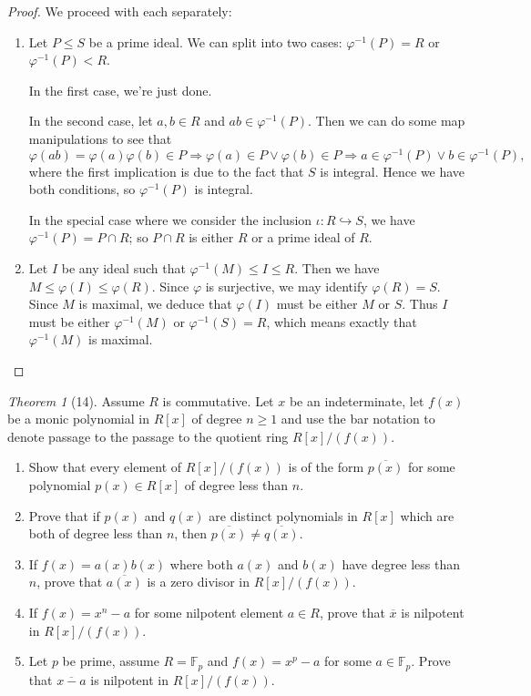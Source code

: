 \documentclass[12pt]{article}
\theoremstyle{remark}
\theoremstyle{named}
\newtheorem*{theorem}{Theorem}
\newcommand{\F}{\mathbb F}
\begin{document}
\begin{proof}
    We proceed with each separately:
    \begin{enumerate}
        \item Let \(P \le S\) be a prime ideal. We can split into two cases: \(\varphi^{-1}(P) = R\) or \(\varphi^{-1}(P) < R\).
        
        In the first case, we're just done. 

        In the second case, let \(a, b \in R\) and \(ab \in \varphi^{-1}(P)\). Then we can do some map manipulations to see that 
        \[\varphi(ab) = \varphi(a)\varphi(b) \in P \Rightarrow \varphi(a) \in P \lor \varphi(b) \in P \Rightarrow a \in \varphi^{-1}(P) \lor b \in \varphi^{-1}(P),\]
        where the first implication is due to the fact that \(S\) is integral. Hence we have both conditions, so \(\varphi^{-1}(P)\) is integral.

        In the special case where we consider the inclusion \(\iota : R \hookrightarrow S\), we have \(\varphi^{-1}(P) = P \cap R\); so \(P \cap R\) is either \(R\) or a prime ideal of \(R\).
        \item Let \(I\) be any ideal such that \(\varphi^{-1}(M) \le I \le R\). Then we have \(M \le \varphi(I) \le \varphi(R)\). Since \(\varphi\) is surjective, we may identify \(\varphi(R) = S\). Since \(M\) is maximal, we deduce that \(\varphi(I)\) must be either \(M\) or \(S\). Thus \(I\) must be either \(\varphi^{-1}(M)\) or \(\varphi^{-1}(S) = R\), which means exactly that \(\varphi^{-1}(M)\) is maximal.
    \end{enumerate}
\end{proof}

\begin{theorem}[14]
    Assume \(R\) is commutative. Let \(x\) be an indeterminate, let \(f(x)\) be a monic polynomial in \(R[x]\) of degree \(n \ge 1\) and use the bar notation to denote passage to the passage to the quotient ring \(R[x]/(f(x))\).
    \begin{enumerate}
        \item Show that every element of \(R[x]/(f(x))\) is of the form \(\overline{p(x)}\) for some polynomial \(p(x) \in R[x]\) of degree less than \(n\).
        \item Prove that if \(p(x)\) and \(q(x)\) are distinct polynomials in \(R[x]\) which are both of degree less than \(n\), then \(\overline{p(x)} \neq \overline{q(x)}\).
        \item If \(f(x) = a(x)b(x)\) where both \(a(x)\) and \(b(x)\) have degree less than \(n\), prove that \(\overline{a(x)}\) is a zero divisor in \(R[x]/(f(x))\).
        \item If \(f(x) = x^n - a\) for some nilpotent element \(a \in R\), prove that \(\overline{x}\) is nilpotent in \(R[x]/(f(x))\).
        \item Let \(p\) be prime, assume \(R = \F_p\) and \(f(x) = x^p - a\) for some \(a \in \F_p\). Prove that \(\overline{x - a}\) is nilpotent in \(R[x]/(f(x))\).
    \end{enumerate}
\end{theorem}
\end{document}
